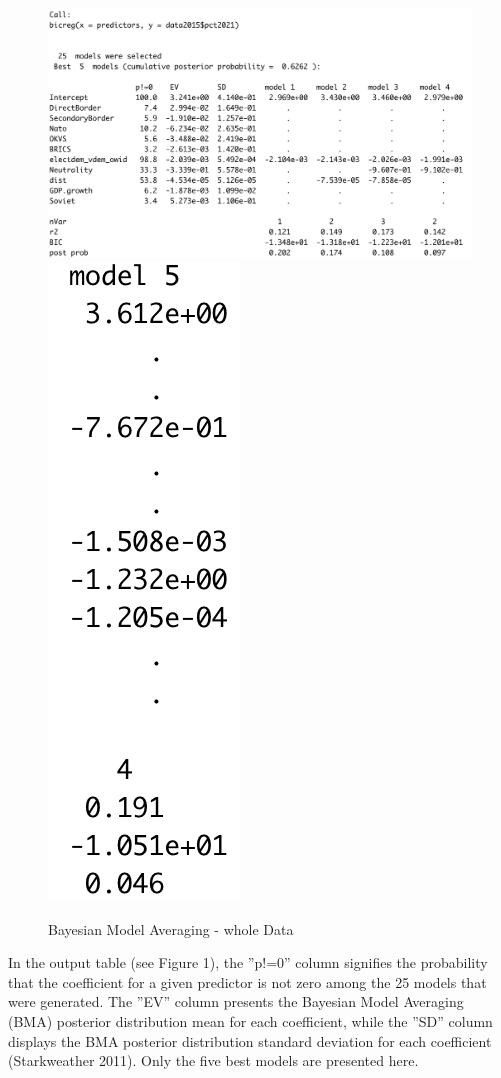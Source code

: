 \documentclass[12pt,a4paper]{article}
\begin{document}
\begin{figure}[h]
\center
\label{F:2}
\includegraphics[scale=0.5]{BMA_results}
\includegraphics[scale=0.5]{BMA_results_2}
\caption{Bayesian Model Averaging - whole Data}
\end{figure}

In the output table (see Figure 1), the ''p!=0'' column signifies the probability that the coefficient for a given predictor is not zero among the 25 models that were generated. The ''EV'' column presents the Bayesian Model Averaging (BMA) posterior distribution mean for each coefficient, while the ''SD'' column displays the BMA posterior distribution standard deviation for each coefficient (Starkweather 2011). Only the five best models are presented here. \\
\end{document}
